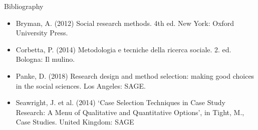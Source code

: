 \documentclass[10pt, aspectratio=169]{beamer}
\begin{document}
\begin{frame}{Bibliography}
    \begin{itemize}
    \item Bryman, A. (2012) Social research methods. 4th ed. New York: Oxford University Press.
    \item Corbetta, P. (2014) Metodologia e tecniche della ricerca sociale. 2. ed. Bologna: Il mulino.
    \item Panke, D. (2018) Research design and method selection: making good choices in the social sciences. Los Angeles: SAGE.
    \item Seawright, J. et al. (2014) ‘Case Selection Techniques in Case Study Research: A Menu of Qualitative and Quantitative Options’, in Tight, M., Case Studies. United Kingdom: SAGE
\end{itemize}
\end{frame}
\end{document}
